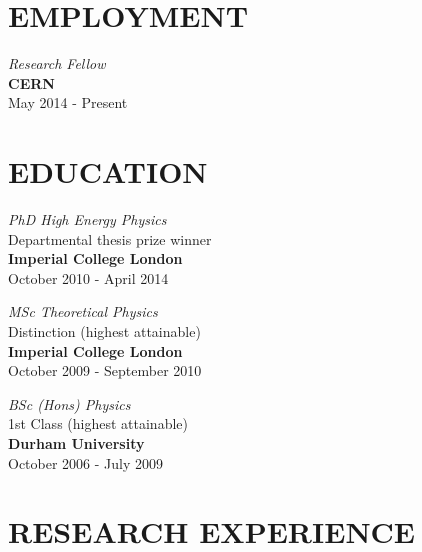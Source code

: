 \documentclass[margin, 10pt]{res} %
\begin{document}
\begin{resume}
\section{EMPLOYMENT}
{\sl Research Fellow} \\
{\bf CERN} \\
May 2014 - Present


\section{EDUCATION}

{\sl PhD High Energy Physics} \\
Departmental thesis prize winner \\
{\bf Imperial College London} \\
October 2010 - April 2014

{\sl MSc Theoretical Physics} \\ %
Distinction (highest attainable) \\ %
{\bf Imperial College London} \\
October 2009 - September 2010

{\sl BSc (Hons) Physics} \\ %
1st Class (highest attainable) \\ %
{\bf Durham University} \\
October 2006 - July 2009

\section{RESEARCH EXPERIENCE}


\end{resume}
\end{document}
